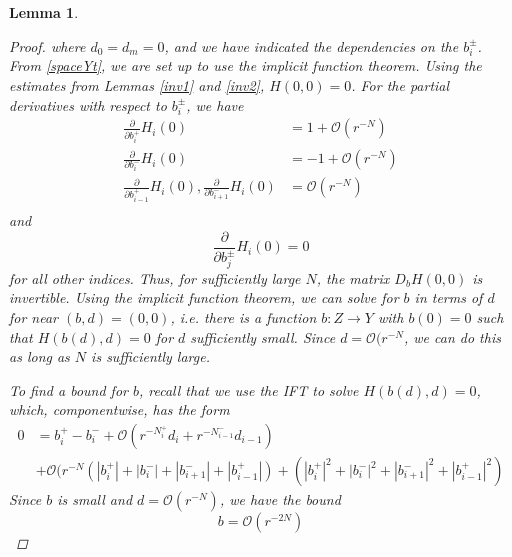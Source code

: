 \documentclass[12pt]{article}
\newtheorem{lemma}{Lemma}
\begin{document}
\begin{lemma}
\begin{proof}
where $d_0 = d_m = 0$, and we have indicated the dependencies on the $b_i^\pm$. From \eqref{spaceYt}, we are set up to use the implicit function theorem. Using the estimates from Lemmas \ref{inv1} and \ref{inv2}, $H(0, 0) = 0$. For the partial derivatives with respect to $b_i^\pm$, we have
\begin{align*}
\frac{\partial}{\partial b_i^+}H_i(0) &= 1 + \mathcal{O}(r^{-N})  \\
\frac{\partial}{\partial b_i^-}H_i(0) &= -1 + \mathcal{O}(r^{-N}) \\
\frac{\partial}{\partial b_{i-1}^+}H_i(0),
\frac{\partial}{\partial b_{i+1}^-}H_i(0) &= \mathcal{O}(r^{-N}) \\
\end{align*}
and 
\[
\frac{\partial}{\partial b_j^\pm}H_i(0) = 0
\]
for all other indices. Thus, for sufficiently large $N$, the matrix $D_b H(0,0)$ is invertible. Using the implicit function theorem, we can solve for $b$ in terms of $d$ for near $(b,d) = (0, 0)$, i.e. there is a function $b: Z \rightarrow Y$ with $b(0) = 0$ such that $H(b(d),d) = 0$ for $d$ sufficiently small. Since $d = \mathcal{O}(r^{-N}$, we can do this as long as $N$ is sufficiently large.

To find a bound for $b$, recall that we use the IFT to solve $H(b(d),d) = 0$, which, componentwise, has the form
\begin{align*}
0 &= b_i^+ - b_i^- + \mathcal{O}(r^{-N_i^+} d_i + r^{-N_{i-1}^-} d_{i-1}) \\
&+ \mathcal{O}( r^{-N}(|b_i^+| + |b_i^-| + |b_{i+1}^-| + |b_{i-1}^+|)
+ (|b_i^+|^2 + |b_i^-|^2 + |b_{i+1}^-|^2 + |b_{i-1}^+|^2)
\end{align*}
Since $b$ is small and $d = \mathcal{O}(r^{-N})$, we have the bound
\[
b = \mathcal{O}(r^{-2N})
\]
\end{proof}
\end{lemma}
\end{document}
